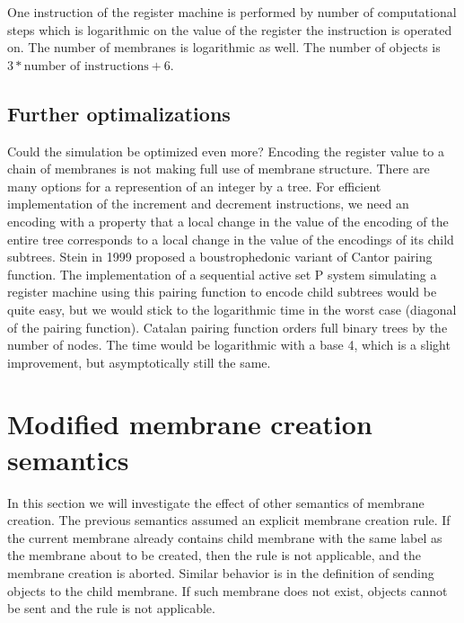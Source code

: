 \documentclass[submission,copyright,creativecommons]{../lib/lncs/llncs}
\begin{document}
One instruction of the register machine is performed by number of computational steps which is logarithmic on the value of the register the instruction is operated on. The number of membranes is logarithmic as well. The number of objects is $3 * \text{number of instructions} + 6$.

\subsection{Further optimalizations} %
\label{sub:further_optimalizations}

Could the simulation be optimized even more? Encoding the register value to a chain of membranes is not making full use of membrane structure. There are many options for a represention of an integer by a tree. For efficient implementation of the increment and decrement instructions, we need an encoding with a property that a local change in the value of the encoding of the entire tree corresponds to a local change in the value of the encodings of its child subtrees. Stein in 1999 \cite{Stein99Plowing} proposed a boustrophedonic variant of Cantor pairing function. The implementation of a sequential active set P system simulating a register machine using this pairing function to encode child subtrees would be quite easy, but we would stick to the logarithmic time in the worst case (diagonal of the pairing function).
Catalan pairing function \cite{Stanley1986EnumerativeCombinatorics} orders full binary trees by the number of nodes. The time would be logarithmic with a base 4, which is a slight improvement, but asymptotically still the same.




\section{Modified membrane creation semantics} %
\label{sec:modified_membrane_creation_semantics}

In this section we will investigate the effect of other semantics of membrane creation. The previous semantics assumed an explicit membrane creation rule. If the current membrane already contains child membrane with the same label as the membrane about to be created, then the rule is not applicable, and the membrane creation is aborted. Similar behavior is in the definition of sending objects to the child membrane. If such membrane does not exist, objects cannot be sent and the rule is not applicable.
\end{document}
